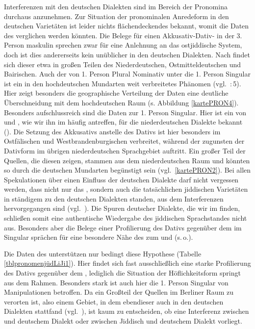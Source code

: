 	 Interferenzen mit den deutschen Dialekten sind im Bereich der Pronomina durchaus anzunehmen. Zur Situation der pronominalen Anredeform in den deutschen Varietäten ist leider nichts flächendeckendes bekannt, womit die Daten des  verglichen werden könnten. Die Belege für einen Akkusativ-Dativ- in der 3. Person maskulin sprechen zwar für eine Anlehnung an das ostjiddische System, doch ist dies andererseits kein unüblicher  in den deutschen Dialekten. Nach \cite[426f]{Shrier1965} findet sich dieser etwa in großen Teilen des Niederdeutschen, Ostmitteldeutschen und Bairischen. Auch der  von 1. Person Plural Nominativ unter die 1. Person Singular  ist ein in den hochdeutschen Mundarten weit verbreitetes Phänomen (vgl.\, :\,5). 
     Hier zeigt besonders die geographische Verteilung der Daten eine deutliche Überschneidung mit dem hochdeutschen Raum (s. Abbildung \ref{kartePRON4}).  Besonders aufschlussreich sind die Daten zur 1. Person Singular. Hier ist ein  von  und , wie wir ihn im  häufig antreffen, für die niederdeutschen Dialekte bekannt (\citealt[427f, 432 Karte 9]{Shrier1965}). Die Setzung des Akkusativs anstelle des Dativs ist hier besonders im Ostfälischen und Westbrandenburgischen verbreitet, während der  zugunsten der Dativform im übrigen niederdeutschen Sprachgebiet auftritt. Ein großer Teil der Quellen, die diesen  zeigen, stammen aus dem niederdeutschen Raum und könnten so durch die deutschen Mundarten begünstigt sein (vgl.\, \ref{kartePRON2}). Bei allen Spekulationen über einen Einfluss der deutschen Dialekte darf nicht vergessen werden, dass nicht nur das , sondern  auch die tatsächlichen jiddischen Varietäten in ständigem  zu den deutschen Dialekten standen, aus dem Interferenzen hervorgegangen sind (vgl.\, \citealt{Schaefer2013}). Die Spuren deutscher Dialekte, die wir im \hai{{\LiJieins}} finden, schließen somit eine authentische Wiedergabe des jiddischen Sprachstandes nicht aus. Besonders aber die Belege einer Profilierung des Dativs gegenüber dem  im Singular sprächen für eine besondere Nähe des  zum  und \hai{{\NOJ}} (s.\,o.).
     
     
     Die Daten des  unterstützen nur bedingt  diese Hypothese (Tabelle \ref{tblpronomenjüdLiJi1}). Hier findet sich fast ausschließlich eine starke Profilierung des Dativs gegenüber dem , lediglich die Situation der Höflichkeitsform springt aus dem Rahmen. Besonders stark ist auch hier die 1. Person Singular von Manipulationen betroffen. Da ein Großteil der Quellen im Berliner Raum zu verorten ist, also einem Gebiet, in dem ebendieser  auch in den deutschen Dialekten stattfand  (vgl.\,  \citealt[427f, 432 Karte 9]{Shrier1965}), ist kaum zu entscheiden, ob eine Interferenz zwischen  und deutschem Dialekt oder zwischen Jiddisch und deutschem Dialekt vorliegt.
     

